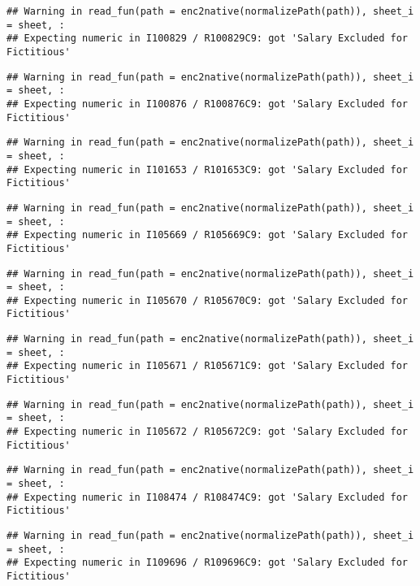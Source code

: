 \documentclass[
]{article}
\begin{document}
\begin{verbatim}
## Warning in read_fun(path = enc2native(normalizePath(path)), sheet_i = sheet, :
## Expecting numeric in I100829 / R100829C9: got 'Salary Excluded for Fictitious'
\end{verbatim}

\begin{verbatim}
## Warning in read_fun(path = enc2native(normalizePath(path)), sheet_i = sheet, :
## Expecting numeric in I100876 / R100876C9: got 'Salary Excluded for Fictitious'
\end{verbatim}

\begin{verbatim}
## Warning in read_fun(path = enc2native(normalizePath(path)), sheet_i = sheet, :
## Expecting numeric in I101653 / R101653C9: got 'Salary Excluded for Fictitious'
\end{verbatim}

\begin{verbatim}
## Warning in read_fun(path = enc2native(normalizePath(path)), sheet_i = sheet, :
## Expecting numeric in I105669 / R105669C9: got 'Salary Excluded for Fictitious'
\end{verbatim}

\begin{verbatim}
## Warning in read_fun(path = enc2native(normalizePath(path)), sheet_i = sheet, :
## Expecting numeric in I105670 / R105670C9: got 'Salary Excluded for Fictitious'
\end{verbatim}

\begin{verbatim}
## Warning in read_fun(path = enc2native(normalizePath(path)), sheet_i = sheet, :
## Expecting numeric in I105671 / R105671C9: got 'Salary Excluded for Fictitious'
\end{verbatim}

\begin{verbatim}
## Warning in read_fun(path = enc2native(normalizePath(path)), sheet_i = sheet, :
## Expecting numeric in I105672 / R105672C9: got 'Salary Excluded for Fictitious'
\end{verbatim}

\begin{verbatim}
## Warning in read_fun(path = enc2native(normalizePath(path)), sheet_i = sheet, :
## Expecting numeric in I108474 / R108474C9: got 'Salary Excluded for Fictitious'
\end{verbatim}

\begin{verbatim}
## Warning in read_fun(path = enc2native(normalizePath(path)), sheet_i = sheet, :
## Expecting numeric in I109696 / R109696C9: got 'Salary Excluded for Fictitious'
\end{verbatim}
\end{document}
